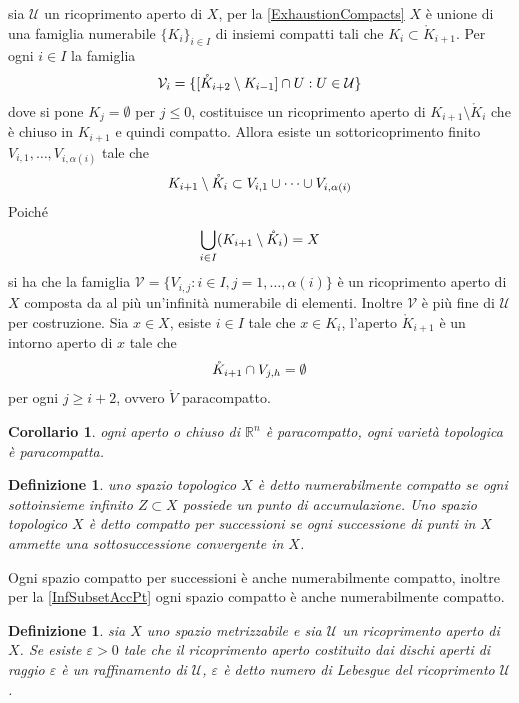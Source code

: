 \documentclass[oneside, 11pt]{amsbook}
\makeatletter
\newcommand{\0}{{(0)}}
\newcommand{\3}{{(3)}}
\theoremstyle{colonplain}
\newtheorem{cor}[thm]{Corollario}
\theoremstyle{colondefinition}
\newtheorem{defn}[thm]{Definizione}
\theoremstyle{colonremark}
\numberwithin{equation}{chapter}
\renewcommand{\proofname}{Dimostrazione}
\renewenvironment{proof}[1][\proofname]{\par
  \pushQED{\qed}%
  \normalfont \topsep6\p@\@plus6\p@\relax
  \trivlist
  \item[\hskip\labelsep\bfseries #1:]\ignorespaces
}{%
  \popQED\endtrivlist\@endpefalse
}
\makeatother
\begin{document}
\begin{proof} 
sia $\mathcal{U}$ un ricoprimento aperto di $X$, per la \cref{ExhaustionCompacts} $X$ è unione di una famiglia numerabile $\{K_i\}_{i \in I}$ di insiemi compatti tali che $K_i \subset \mathring{K}_{i + 1}$. Per ogni $i \in I$ la famiglia 
\begin{align}
    \mathcal{V}_i = \{[\mathring{K}_{i + 2} \setminus K_{i - 1}] \cap U : U \in \mathcal{U}\} \notag
\end{align}
dove si pone $K_j = \emptyset$ per $j \leq 0$, costituisce un ricoprimento aperto di $K_{i + 1} \setminus \mathring{K}_i$ che è chiuso in $K_{i + 1}$ e quindi compatto. Allora esiste un sottoricoprimento finito $V_{i, 1}, \dots, V_{i, \alpha(i)}$ tale che 
\begin{align}
    K_{i + 1} \setminus \mathring{K}_i \subset V_{i, 1} \cup \dots \cup V_{i, \alpha(i)} \notag
\end{align}
Poiché 
\begin{align}
    \bigcup_{i \in I}(K_{i + 1} \setminus \mathring{K}_i) = X \notag
\end{align}
si ha che la famiglia $\mathcal{V} = \{V_{i, j} : i \in I, j = 1, \dots, \alpha(i)\}$ è un ricoprimento aperto di $X$ composta da al più un'infinità numerabile di elementi. Inoltre $\mathcal{V}$ è più fine di $\mathcal{U}$ per costruzione. Sia $x \in X$, esiste $i \in I$ tale che $x \in K_i$, l'aperto $\mathring{K}_{i + 1}$ è un intorno aperto di $x$ tale che 
\begin{align}
    \mathring{K}_{i + 1} \cap V_{j, h} = \emptyset \notag
\end{align}
per ogni $j \geq  i + 2$, ovvero $\mathring{V}$ paracompatto.
\end{proof}
\begin{cor}
ogni aperto o chiuso di $\mathbb{R}^n$ è paracompatto, ogni varietà topologica è paracompatta.
\end{cor}
\begin{defn}
uno spazio topologico $X$ è detto \textit{numerabilmente compatto} se ogni sottoinsieme infinito $Z \subset X$ possiede un punto di accumulazione. Uno spazio topologico $X$ è detto \textit{compatto per successioni} se ogni successione di punti in $X$ ammette una sottosuccessione convergente in $X$.
\end{defn}
Ogni spazio compatto per successioni è anche numerabilmente compatto, inoltre per la \cref{InfSubsetAccPt} ogni spazio compatto è anche numerabilmente compatto.
\begin{defn}
sia $X$ uno spazio metrizzabile e sia $\mathcal{U}$ un ricoprimento aperto di $X$. Se esiste $\varepsilon > 0$ tale che il ricoprimento aperto costituito dai dischi aperti di raggio $\varepsilon$ è un raffinamento di $\mathcal{U}$, $\varepsilon$ è detto numero di Lebesgue del ricoprimento $\mathcal{U}$.
\end{defn}
\end{document}
